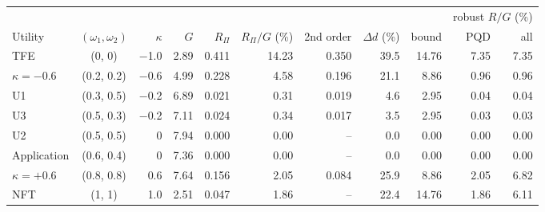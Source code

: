 \small
\begin{tabular}{@{}lcrrrrrrrrr@{}}
\toprule
& & & & & & & & & \multicolumn{2}{c}{robust $R/G$ (\%)}\\
\cmidrule(l){10-11}
Utility & $(\omega_1,\omega_2)$ & $\kappa$ & $G$ & $R_\Pi$ & $R_\Pi/G$ (\%) & 2nd order & $\Delta d$ (\%) & bound & PQD & all\\
\midrule
TFE & (0, 0) & \ensuremath{-}1.0 & 2.89 & 0.411 & 14.23 & 0.350 & 39.5 & 14.76 & 7.35 & 7.35\\
$\kappa=-0.6$ & (0.2, 0.2) & \ensuremath{-}0.6 & 4.99 & 0.228 & 4.58 & 0.196 & 21.1 & 8.86 & 0.96 & 0.96\\
U1 & (0.3, 0.5) & \ensuremath{-}0.2 & 6.89 & 0.021 & 0.31 & 0.019 & 4.6 & 2.95 & 0.04 & 0.04\\
U3 & (0.5, 0.3) & \ensuremath{-}0.2 & 7.11 & 0.024 & 0.34 & 0.017 & 3.5 & 2.95 & 0.03 & 0.03\\
U2 & (0.5, 0.5) & 0 & 7.94 & 0.000 & 0.00 & -- & 0.0 & 0.00 & 0.00 & 0.00\\
Application & (0.6, 0.4) & 0 & 7.36 & 0.000 & 0.00 & -- & 0.0 & 0.00 & 0.00 & 0.00\\
$\kappa=+0.6$ & (0.8, 0.8) & 0.6 & 7.64 & 0.156 & 2.05 & 0.084 & 25.9 & 8.86 & 2.05 & 6.82\\
NFT & (1, 1) & 1.0 & 2.51 & 0.047 & 1.86 & -- & 22.4 & 14.76 & 1.86 & 6.11\\
\bottomrule
\end{tabular}
